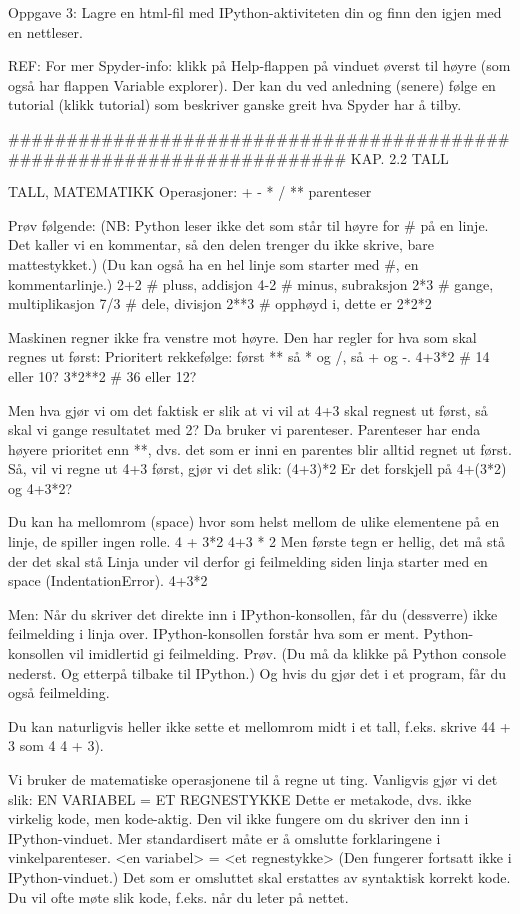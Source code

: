 \documentclass[a4paper,11pt,utf8]{book}
\begin{document}
Oppgave 3:
Lagre en html-fil med IPython-aktiviteten din og finn den igjen med en nettleser. 


REF: For mer Spyder-info: klikk på Help-flappen på vinduet øverst til høyre
(som også har flappen Variable explorer).
Der kan du ved anledning (senere) følge en tutorial (klikk tutorial)
som beskriver ganske greit hva Spyder har å tilby.


######################################################################## 
KAP. 2.2  TALL

TALL, MATEMATIKK
Operasjoner: + - * / ** parenteser

Prøv følgende:
(NB: Python leser ikke det som står til høyre for # på en linje.
Det kaller vi en kommentar, så den delen trenger du ikke skrive, bare mattestykket.)
(Du kan også ha en hel linje som starter med #, en kommentarlinje.) 
2+2   # pluss, addisjon
4-2   # minus, subraksjon
2*3   # gange, multiplikasjon
7/3   # dele, divisjon
2**3  # opphøyd i, dette er 2*2*2

Maskinen regner ikke fra venstre mot høyre. 
Den har regler for hva som skal regnes ut først: 
Prioritert rekkefølge: først ** så * og /, så + og -. 
4+3*2   # 14 eller 10? 
3*2**2  # 36 eller 12?

Men hva gjør vi om det faktisk er slik at vi vil at 4+3 skal regnest ut først,
så skal vi gange resultatet med 2? 
Da bruker vi parenteser. Parenteser har enda høyere prioritet enn **,
dvs. det som er inni en parentes blir alltid regnet ut først.
Så, vil vi regne ut 4+3 først, gjør vi det slik: 
(4+3)*2 
Er det forskjell på 4+(3*2) og 4+3*2? 

Du kan ha mellomrom (space) hvor som helst mellom de ulike elementene på en linje,
de spiller ingen rolle. 
4 + 3*2
4+3 * 2 
Men første tegn er hellig, det må stå der det skal stå 
Linja under vil derfor gi feilmelding siden linja starter med en space (IndentationError). 
 4+3*2

Men: Når du skriver det direkte inn i IPython-konsollen, får du (dessverre) ikke
feilmelding i linja over.
IPython-konsollen forstår hva som er ment.
Python-konsollen vil imidlertid gi feilmelding.
Prøv. (Du må da klikke på Python console nederst. Og etterpå tilbake til IPython.) 
Og hvis du gjør det i et program, får du også feilmelding. 

Du kan naturligvis heller ikke sette et mellomrom midt i et tall,
f.eks. skrive 44 + 3 som 4 4 + 3). 



Vi bruker de matematiske operasjonene til å regne ut ting.
Vanligvis gjør vi det slik:
EN VARIABEL = ET REGNESTYKKE
Dette er metakode, dvs. ikke virkelig kode, men kode-aktig. 
Den vil ikke fungere om du skriver den inn i IPython-vinduet.
Mer standardisert måte er å omslutte forklaringene i vinkelparenteser.
<en variabel> = <et regnestykke> 
(Den fungerer fortsatt ikke i IPython-vinduet.)
Det som er omsluttet skal erstattes av syntaktisk korrekt kode.
Du vil ofte møte slik kode, f.eks. når du leter på nettet.
\end{document}
